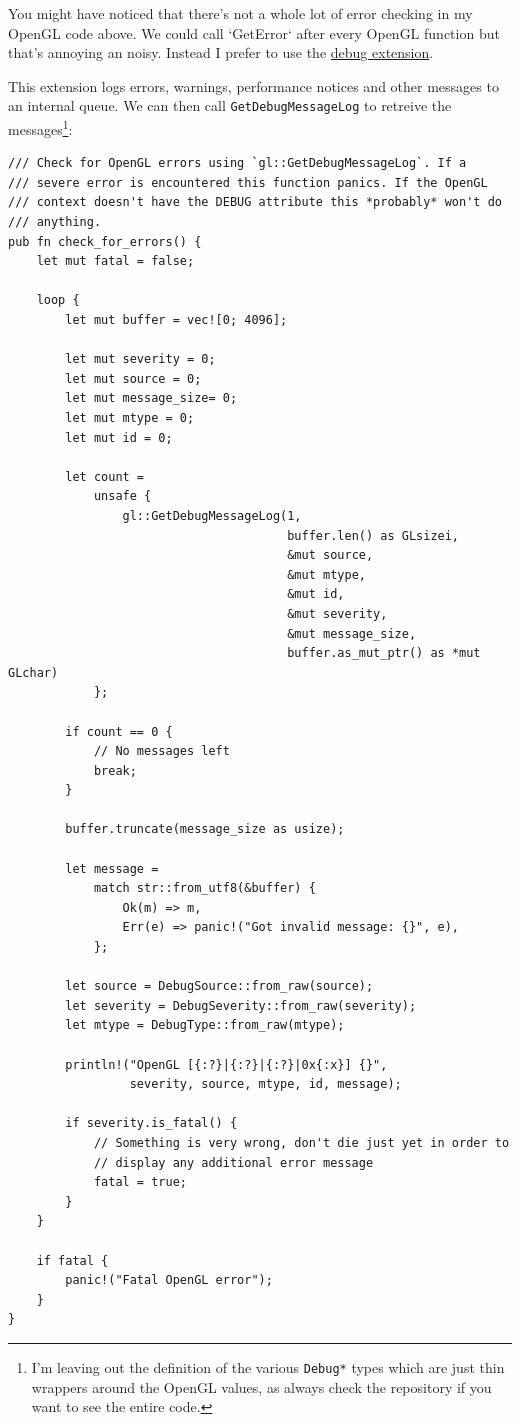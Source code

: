 \documentclass[a4paper]{article}
\newcommand{\code}[1] {\texttt{#1}}
\begin{document}
You might have noticed that there's not a whole lot of error checking
in my OpenGL code above. We could call `GetError` after every OpenGL
function but that's annoying an noisy. Instead I prefer to use the
\href{https://www.khronos.org/registry/gles/extensions/KHR/debug.txt}{debug
  extension}.

This extension logs errors, warnings, performance notices and other
messages to an internal queue. We can then call
\code{GetDebugMessageLog} to retreive the messages\footnote{I'm
  leaving out the definition of the various \code{Debug*} types which
  are just thin wrappers around the OpenGL values, as always check the
  repository if you want to see the entire code.}:

\begin{lstlisting}
/// Check for OpenGL errors using `gl::GetDebugMessageLog`. If a
/// severe error is encountered this function panics. If the OpenGL
/// context doesn't have the DEBUG attribute this *probably* won't do
/// anything.
pub fn check_for_errors() {
    let mut fatal = false;

    loop {
        let mut buffer = vec![0; 4096];

        let mut severity = 0;
        let mut source = 0;
        let mut message_size= 0;
        let mut mtype = 0;
        let mut id = 0;

        let count =
            unsafe {
                gl::GetDebugMessageLog(1,
                                       buffer.len() as GLsizei,
                                       &mut source,
                                       &mut mtype,
                                       &mut id,
                                       &mut severity,
                                       &mut message_size,
                                       buffer.as_mut_ptr() as *mut GLchar)
            };

        if count == 0 {
            // No messages left
            break;
        }

        buffer.truncate(message_size as usize);

        let message =
            match str::from_utf8(&buffer) {
                Ok(m) => m,
                Err(e) => panic!("Got invalid message: {}", e),
            };

        let source = DebugSource::from_raw(source);
        let severity = DebugSeverity::from_raw(severity);
        let mtype = DebugType::from_raw(mtype);

        println!("OpenGL [{:?}|{:?}|{:?}|0x{:x}] {}",
                 severity, source, mtype, id, message);

        if severity.is_fatal() {
            // Something is very wrong, don't die just yet in order to
            // display any additional error message
            fatal = true;
        }
    }

    if fatal {
        panic!("Fatal OpenGL error");
    }
}
\end{lstlisting}
\end{document}
